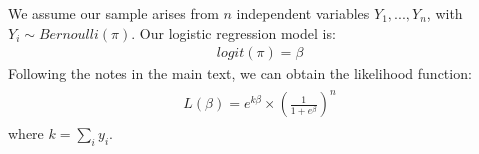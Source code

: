 \documentclass[letterpaper,10pt,english]{jupyterBook}
\begin{document}
\sphinxAtStartPar
{} We assume our sample arises from \(n\) independent variables \(Y_1, ..., Y_n\), with \(Y_i \sim Bernoulli(\pi)\). Our logistic regression model is:
\begin{equation*}
\begin{split}
logit(\pi) = \beta
\end{split}
\end{equation*}
\sphinxAtStartPar
{} Following the notes in the main text, we can obtain the likelihood function:
\begin{equation*}
\begin{split}
\begin{align*}
L(\beta)  = e^{k \beta}  \times \left(\frac{1}{1 + e^{\beta}} \right)^n
\end{align*}
\end{split}
\end{equation*}
\sphinxAtStartPar
where \(k = \sum_i y_i\).
\end{document}
